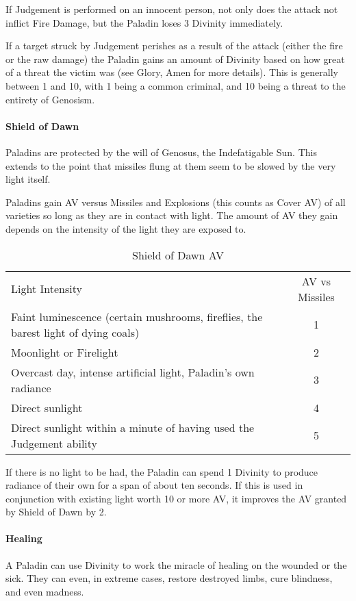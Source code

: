 \documentclass[oneside,11pt,english]{book}
\begin{document}
If Judgement is performed on an innocent person, not only does the attack not inflict Fire 
Damage, but the Paladin loses 3 Divinity immediately. 


If a target struck by Judgement perishes as a result of the attack (either the fire or the raw 
damage) the Paladin gains an amount of Divinity based on how great of a threat the victim was 
(see Glory, Amen for more details). This is generally between 1 and 10, with 1 being a common 
criminal, and 10 being a threat to the entirety of Genosism. 
\paragraph{Shield of Dawn}
Paladins are protected by the will of Genosus, the Indefatigable Sun. This extends to the point 
that missiles flung at them seem to be slowed by the very light itself.


Paladins gain AV versus Missiles and Explosions (this counts as Cover AV) of all varieties so 
long as they are in contact with light. The amount of AV they gain depends on the intensity of the 
light they are exposed to. 
\begin{table}[!h]
	\caption{Shield of Dawn AV}
	\label{tab:Shield of Dawn AV}
	\begin{tabu} spread 0pt {Xc}
		Light Intensity& AV vs Missiles\\
		Faint luminescence (certain mushrooms, fireflies, the barest light of dying coals)& 1\\
		Moonlight or Firelight &2\\
		Overcast day, intense artificial light, Paladin's own radiance& 3\\
		Direct sunlight& 4\\
		Direct sunlight within a minute of having used the Judgement ability& 5\\
	\end{tabu}
\end{table}
If there is no light to be had, the Paladin can spend 1 Divinity to produce radiance of their own 
for a span of about ten seconds. If this is used in conjunction with existing light worth 10 or more 
AV, it improves the AV granted by Shield of Dawn by 2. 
\paragraph{Healing}
A Paladin can use Divinity to work the miracle of healing on the wounded or the sick. They can 
even, in extreme cases, restore destroyed limbs, cure blindness, and even madness.
\end{document}
